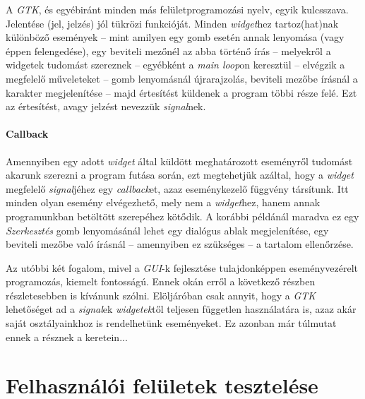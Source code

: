 A \textit{GTK}, és egyébiránt minden más felületprogramozási nyelv, egyik kulcsszava. Jelentése (jel, jelzés) jól tükrözi funkcióját. Minden \textit{widget}hez tartoz(hat)nak különböző események -- mint amilyen egy gomb esetén annak lenyomása (vagy éppen felengedése), egy beviteli mezőnél az abba történő írás -- melyekről a widgetek tudomást szereznek -- egyébként a \textit{main loop}on keresztül -- elvégzik a megfelelő műveleteket -- gomb lenyomásnál újrarajzolás, beviteli mezőbe írásnál a karakter megjelenítése -- majd értesítést küldenek a program többi része felé. Ezt az értesítést, avagy jelzést nevezzük \textit{signal}nek.

\paragraph{Callback}

Amennyiben egy adott \textit{widget} által küldött meghatározott eseményről tudomást akarunk szerezni a program futása során, ezt megtehetjük azáltal, hogy a \textit{widget} megfelelő \textit{signal}jéhez egy \textit{callback}et, azaz eseménykezelő függvény társítunk. Itt minden olyan esemény elvégezhető, mely nem a \textit{widget}hez, hanem annak programunkban betöltött szerepéhez kötődik. A korábbi példánál maradva ez egy \textit{Szerkesztés} gomb lenyomásánál lehet egy dialógus ablak megjelenítése, egy beviteli mezőbe való írásnál -- amennyiben ez szükséges -- a tartalom ellenőrzése.

Az utóbbi két fogalom, mivel a \textit{GUI}-k fejlesztése tulajdonképpen eseményvezérelt programozás, kiemelt fontosságú. Ennek okán erről a következő részben részletesebben is kívánunk szólni. Elöljáróban csak annyit, hogy a \textit{GTK} lehetőséget ad a \textit{signal}ek \textit{widgetek}től teljesen független használatára is, azaz akár saját osztályainkhoz is rendelhetünk eseményeket. Ez azonban már túlmutat ennek a résznek a keretein...

\section{Felhasználói felületek tesztelése}
